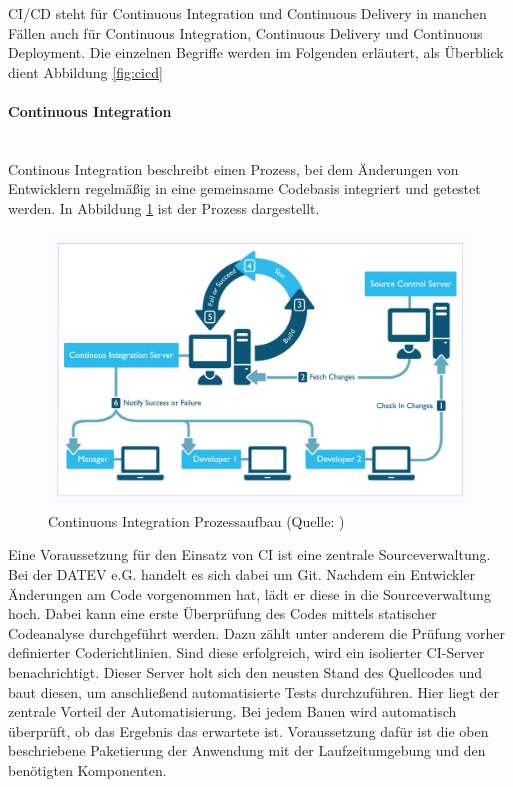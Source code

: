 CI/CD steht für \glqq Continuous Integration und Continuous Delivery\grqq{} in manchen Fällen auch für \glqq Continuous Integration, Continuous Delivery und Continuous Deployment\grqq{}.
Die einzelnen Begriffe werden im Folgenden erläutert, als Überblick dient Abbildung \ref{fig:cicd}
\paragraph{\glqq Continuous Integration\grqq}~\\
Continous Integration beschreibt einen Prozess, bei dem Änderungen von Entwicklern regelmäßig in eine gemeinsame Codebasis integriert und getestet werden.
In Abbildung \ref{fig:ci} ist der Prozess dargestellt.
\begin{figure}[h]
	\centering
	\includegraphics[width=\textwidth]{figures/CI.png}
	\caption{Continuous Integration Prozessaufbau (Quelle: \cite{.25.2.2020e})}
	\label{fig:ci}
\end{figure}
Eine Voraussetzung für den Einsatz von CI ist eine zentrale Sourceverwaltung.
Bei der DATEV e.G. handelt es sich dabei um Git.
Nachdem ein Entwickler Änderungen am Code vorgenommen hat, lädt er diese in die Sourceverwaltung hoch.
Dabei kann eine erste Überprüfung des Codes mittels statischer Codeanalyse durchgeführt werden.
Dazu zählt unter anderem die Prüfung vorher definierter Coderichtlinien.
Sind diese erfolgreich, wird ein isolierter CI-Server benachrichtigt.
Dieser Server holt sich den neusten Stand des Quellcodes und baut diesen, um anschließend automatisierte Tests durchzuführen.
Hier liegt der zentrale Vorteil der Automatisierung. 
Bei jedem Bauen wird automatisch überprüft, ob das Ergebnis das erwartete ist.
Voraussetzung dafür ist die oben beschriebene Paketierung der Anwendung mit der Laufzeitumgebung und den benötigten Komponenten. 

